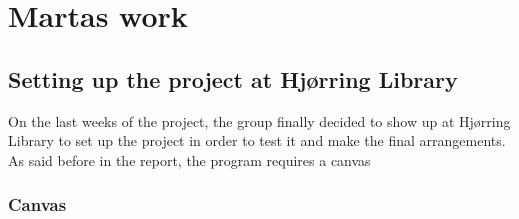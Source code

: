 \chapter{Martas work}

\section{Setting up the project at Hj{\o}rring Library}
On the last weeks of the project, the group finally decided to show up at Hj{\o}rring Library to set up the project in order to test it and make the final arrangements. As said before in the report, the program requires a canvas 
\subsection{Canvas}

